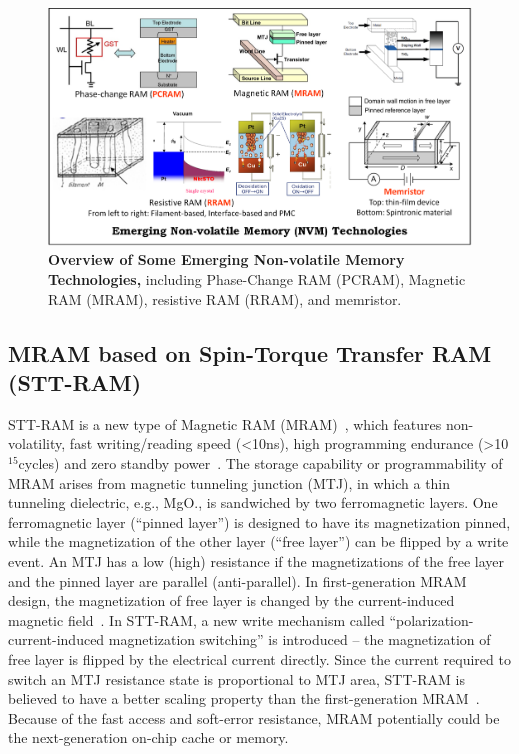 \begin{figure}
\centering
\includegraphics[width=1\textwidth]{./figure/1_technology_half.pdf}
\vspace{-10pt}
\caption{\textbf{Overview of Some Emerging Non-volatile Memory Technologies,} including Phase-Change RAM (PCRAM), Magnetic RAM (MRAM), resistive RAM (RRAM), and memristor. }
\label{technology}
\vspace{-10pt}
\end{figure}

\subsection{MRAM based on Spin-Torque Transfer RAM (STT-RAM)}
STT-RAM is a new type of Magnetic RAM (MRAM)~\cite{ITRS07,Hosomi05,MRAM:TTO+06,MRAM:ZBM+06,mram:ibm:maffitt}, which features non-volatility, fast writing/reading speed (\textless 10ns), high programming endurance (\textgreater 10$^{15}$cycles) and zero standby power~\cite{ITRS07}. The storage capability or programmability of MRAM arises from magnetic tunneling junction (MTJ), in which a thin tunneling dielectric, e.g., MgO., is sandwiched by two ferromagnetic layers. One ferromagnetic layer (``pinned layer'') is designed to have its magnetization pinned, while the magnetization of the other layer (``free layer'') can be flipped by a write event. An MTJ has a low (high) resistance if the magnetizations of the free layer and the pinned layer are parallel (anti-parallel). In first-generation MRAM design, the magnetization of free layer is changed by the current-induced magnetic field~\cite{Motoyoshi04,Ha04}. In STT-RAM, a new write mechanism called ``polarization-current-induced magnetization switching'' is introduced -- the magnetization of free layer is flipped by the electrical current directly. Since the current required to switch an MTJ resistance state is proportional to MTJ area, STT-RAM is believed to have a better scaling property than the first-generation MRAM~\cite{Hosomi05,Kawahara07,MRAM:TTO+06,Diao07,Salahuddin07,Beach08,Kishi08}. Because of the fast access and soft-error resistance, MRAM potentially could be the next-generation on-chip cache or memory.

